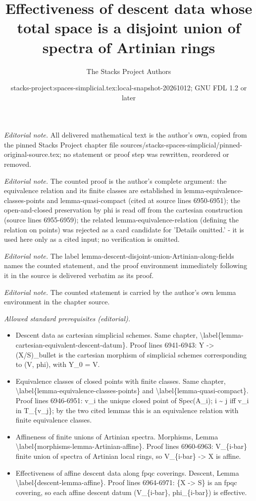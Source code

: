 \documentclass{stacks-project}
\title{Effectiveness of descent data whose total space is a disjoint union of spectra of Artinian rings}
\author{The Stacks Project Authors}
\date{stacks-project:spaces-simplicial.tex:local-snapshot-20261012; GNU FDL 1.2 or later}
\theoremstyle{plain}
\theoremstyle{definition}
\theoremstyle{remark}
\numberwithin{equation}{subsection}
\begin{document}
\maketitle
\noindent\textit{Editorial note.} All delivered mathematical text is the author's own, copied from the pinned Stacks Project chapter file sources/stacks-spaces-simplicial/pinned-original-source.tex; no statement or proof step was rewritten, reordered or removed.\par\medskip
\noindent\textit{Editorial note.} The counted proof is the author's complete argument: the equivalence relation and its finite classes are established in lemma-equivalence-classes-points and lemma-quasi-compact (cited at source lines 6950-6951); the open-and-closed preservation by phi is read off from the cartesian construction (source lines 6955-6959); the related lemma-equivalence-relation (defining the relation on points) was rejected as a card candidate for 'Details omitted.' - it is used here only as a cited input; no verification is omitted.\par\medskip
\noindent\textit{Editorial note.} The label lemma-descent-disjoint-union-Artinian-along-fields names the counted statement, and the proof environment immediately following it in the source is delivered verbatim as its proof.\par\medskip
\noindent\textit{Editorial note.} The counted statement is carried by the author's own lemma environment in the chapter source.\par\medskip
\noindent\textit{Allowed standard prerequisites (editorial).}\begin{itemize}
\item Descent data as cartesian simplicial schemes. Same chapter, \textbackslash{}label\{lemma-cartesian-equivalent-descent-datum\}. Proof lines 6941-6943: Y -> (X/S)\_bullet is the cartesian morphism of simplicial schemes corresponding to (V, phi), with Y\_0 = V.
\item Equivalence classes of closed points with finite classes. Same chapter, \textbackslash{}label\{lemma-equivalence-classes-points\} and \textbackslash{}label\{lemma-quasi-compact\}. Proof lines 6946-6951: v\_i the unique closed point of Spec(A\_i); i \textasciitilde{} j iff v\_i in T\_\{v\_j\}; by the two cited lemmas this is an equivalence relation with finite equivalence classes.
\item Affineness of finite unions of Artinian spectra. Morphisms, Lemma \textbackslash{}label\{morphisms-lemma-Artinian-affine\}. Proof lines 6960-6963: V\_\{i-bar\} finite union of spectra of Artinian local rings, so V\_\{i-bar\} -> X is affine.
\item Effectiveness of affine descent data along fpqc coverings. Descent, Lemma \textbackslash{}label\{descent-lemma-affine\}. Proof lines 6964-6971: \{X -> S\} is an fpqc covering, so each affine descent datum (V\_\{i-bar\}, phi\_\{i-bar\}) is effective.
\end{itemize}\medskip
\end{document}
